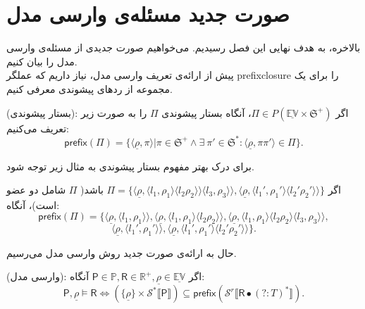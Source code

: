 \section{صورت جدید مسئله‌ی وارسی مدل}
بالاخره، به هدف نهایی این فصل رسیدیم. می‌خواهیم صورت جدیدی از مسئله‌ی وارسی مدل را بیان ‌کنیم.\\
پیش از ارائه‌ی تعریف وارسی مدل، نیاز داریم که عملگر \gls{prefixclosure} را برای یک مجموعه از ردهای پیشوندی معرفی کنیم.
\begin{defn}
	(بستار پیشوندی):
	اگر 
	$\Pi \in \mathit{P}(\mathbb{\underline{EV}\times \mathfrak{S}^+})$،
	آنگاه بستار پیشوندی $\Pi$ را به صورت زیر تعریف می‌کنیم:
	$$\mathsf{prefix}(\Pi)=
	\{\langle \underline{\rho},\pi\rangle | \pi \in \mathfrak{S^+} \land \exists\
	\pi' \in \mathfrak{S^*}: \langle \underline{\rho}, \pi \pi' \rangle \in \Pi \}.$$
\end{defn}

برای درک بهتر مفهوم بستار پیشوندی به مثال زیر توجه شود.
\begin{exm}
	اگر 
	$\Pi = \{\langle\underline{\rho},\langle l_1 , \rho_1 \rangle 
	\langle l_2  \rho_2 \rangle\rangle  \langle l_3 , \rho_3 \rangle\rangle 
	,
	\langle\underline{\rho},\langle {l_1}' , {\rho_1}' \rangle  \langle {l_2}'  {\rho_2}' \rangle\rangle
	\}$
	باشد( $\Pi$ شامل دو عضو است)، آنگاه:
	$$
	\mathsf{prefix}(\Pi)=
	\{
	\langle\underline{\rho},\langle l_1 , \rho_1 \rangle\rangle ,
	\langle\underline{\rho},\langle l_1 , \rho_1 \rangle  \langle l_2  \rho_2 \rangle\rangle,
	\langle\underline{\rho},\langle l_1 , \rho_1 \rangle  \langle l_2  \rho_2 \rangle  \langle l_3 , \rho_3 \rangle\rangle ,$$
	$$
	\langle\underline{\rho},\langle {l_1}' , {\rho_1}' \rangle\rangle,
	\langle\underline{\rho},\langle {l_1}' , {\rho_1}' \rangle  \langle {l_2}'  {\rho_2}' \rangle\rangle
	\}.
	$$

\end{exm}
حال به ارائه‌ی صورت جدید روش وارسی مدل می‌رسیم.
\begin{defn}
(وارسی مدل):
	اگر 
	$\mathsf{P}\in\mathbb{P} , \mathsf{R} \in \mathbb{R}^+ , \underline{\rho} \in \underline{\mathbb{EV}}$
	آنگاه:
	$$\mathsf{P},\underline{\rho} \models \mathsf{R}
	 \Leftrightarrow
	(\{\underline{\rho}\}\times \mathcal{S}^* \llbracket\mathsf{P}\rrbracket) \subseteq 
	\mathsf{prefix} (\mathcal{S}^r \llbracket\mathsf{R} \bullet (?:\mathit{T})^*\rrbracket).
	$$
\end{defn}

